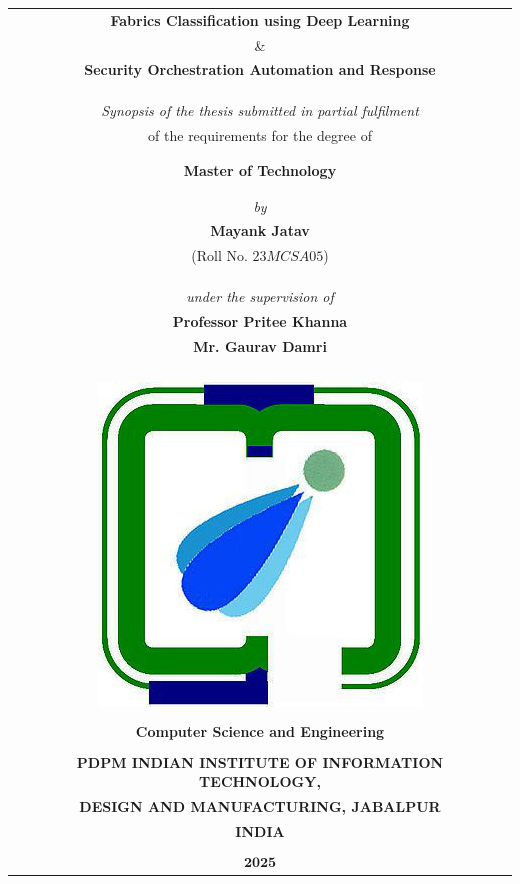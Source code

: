 
\begin{titlepage}
\thispagestyle{empty}


\begin{table}
	\centering
	\begin{tabular}{c}
		\Large \textbf{Fabrics Classification using Deep Learning} \\
		\& \\
		\Large \textbf{Security Orchestration Automation and Response} \\
		\\
		\\
            \\
		\it Synopsis of the thesis submitted in partial fulfilment \\of the requirements for the degree of	\\
            \\
            \\
           
		\bf Master of Technology	\\
		\\
		\\
		
		\it by	\\
		\large \bf {Mayank Jatav}	\\
		(Roll No. $23MCSA05$)	\\
		\\
		\\
		\\
		\it under the supervision of	\\
		\large \bf Professor Pritee Khanna	\\
		\large \bf Mr. Gaurav Damri \\

		\\
		\\
		\\
		\\
		\includegraphics[width=.17\textwidth]{images/iiitdmj.png}	\\
		\\
		\normalsize{\textbf{Computer Science and Engineering}}	\\
		\\
		\bf PDPM INDIAN INSTITUTE OF INFORMATION TECHNOLOGY,	\\
		\bf DESIGN AND MANUFACTURING, JABALPUR	\\
		\bf INDIA	\\
		\\
		$\mathbf{2025}$	\\
	\end{tabular}
\end{table}
\pagebreak


\end{titlepage}
